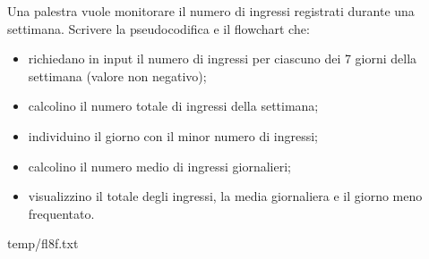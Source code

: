 \documentclass[11pt,fleqn]{book}
\begin{document}
\begin{esercizio}[2]
    Una palestra vuole monitorare il numero di ingressi registrati durante una settimana.
    Scrivere la pseudocodifica e il flowchart che:
    \begin{itemize}[label=--, labelsep=0.3cm]
	\item richiedano in input il numero di ingressi per ciascuno dei 7 giorni della settimana (valore non negativo);
	\item calcolino il numero totale di ingressi della settimana;
	\item individuino il giorno con il minor numero di ingressi;
	\item calcolino il numero medio di ingressi giornalieri;
	\item visualizzino il totale degli ingressi, la media giornaliera e il giorno meno frequentato.
	\end{itemize}
    \ifsoluzioni
        \solution

        \begin{filecontents*}{temp/fl8f.txt}
        
        \end{filecontents*}

        \immediate{}
        
        \newpage

        \immediate{}
        
        \newpage
    \fi
\end{esercizio}
\end{document}
